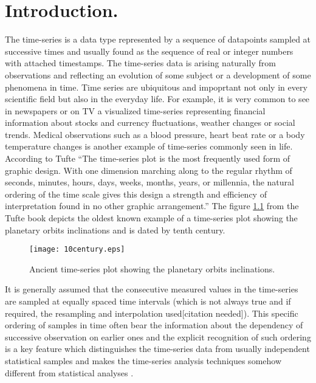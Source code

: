 \chapter{Introduction.}
The time-series is a data type represented by a sequence of datapoints sampled at successive times and usually found as the sequence of real or integer numbers with attached timestamps. The time-series data is arising naturally from observations and reflecting an evolution of some subject or a development of some phenomena in time. Time series are ubiquitous and impoprtant not only in every scientific field but also in the everyday life. For example, it is very common to see in newspapers or on TV a visualized time-series representing financial information about stocks and currency fluctuations, weather changes or social trends. Medical observations such as a blood pressure, heart beat rate or a body temperature changes is another example of time-series commonly seen in life. According to Tufte \cite{citeulike:1454223} ``The time-series plot is the most frequently used form of graphic design. With one dimension marching along to the regular rhythm of seconds, minutes, hours, days, weeks, months, years, or millennia, the natural ordering of the time scale gives this design a strength and efficiency of interpretation found in no other graphic arrangement.'' The figure \ref{fig:10century} from the Tufte book depicts the oldest known example of a time-series plot showing the planetary orbits inclinations and is dated by tenth century.
\begin{figure}[tbp]
   \centering
   \texttt{[image: 10century.eps]}
   \caption{Ancient time-series plot showing the planetary orbits inclinations.}
   \label{fig:10century}
\end{figure} 
It is generally assumed that the consecutive measured values in the time-series are sampled at equally spaced time intervals (which is not always true and if required, the resampling and interpolation used[citation needed]). This specific ordering of samples in time often bear the information about the dependency of successive observation on earlier ones and the explicit recognition of such ordering is a key feature which distinguishes the time-series data from usually independent statistical samples and makes the time-series analysis techniques somehow different from statistical analyses \cite{citeulike:3989988}. 

